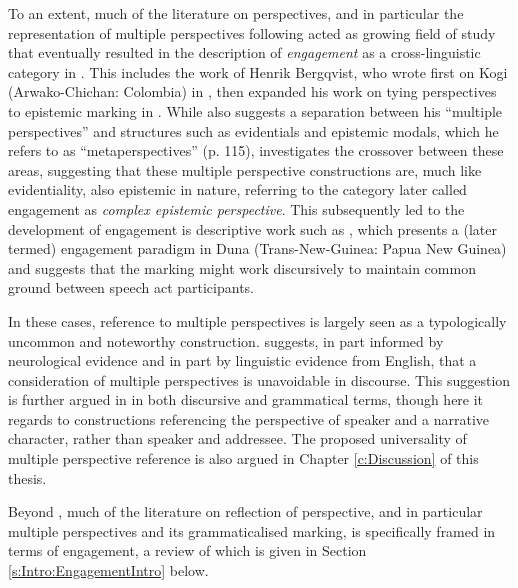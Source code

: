 To an extent, much of the literature on perspectives, and in particular the representation of multiple perspectives following  acted as growing field of study that eventually resulted in the description of \textit{engagement} as a cross-linguistic category in . This includes the work of Henrik Bergqvist, who wrote first on Kogi (Arwako-Chichan: Colombia) in , then expanded his work on tying perspectives to epistemic marking in . While  also suggests a separation between his ``multiple perspectives'' and structures such as evidentials and epistemic modals, which he refers to as ``metaperspectives'' (p. 115),  investigates the crossover between these areas, suggesting that these multiple perspective constructions are, much like evidentiality, also epistemic in nature, referring to the category later called engagement as \textit{complex epistemic perspective}. This subsequently led to the development of engagement is descriptive work such as , which presents a (later termed) engagement paradigm in Duna (Trans-New-Guinea: Papua New Guinea) and suggests that the marking might work discursively to maintain common ground between speech act participants.

In these cases, reference to multiple perspectives is largely seen as a typologically uncommon and noteworthy construction.  suggests, in part informed by neurological evidence and in part by linguistic evidence from English, that a consideration of multiple perspectives is unavoidable in discourse. This suggestion is further argued in  in both discursive and grammatical terms, though here it regards to constructions referencing the perspective of speaker and a narrative character, rather than speaker and addressee. The proposed universality of multiple perspective reference is also argued in Chapter \ref{c:Discussion} of this thesis. 

Beyond , much of the literature on reflection of perspective, and in particular multiple perspectives and its grammaticalised marking, is specifically framed in terms of engagement, a review of which is given in Section \ref{s:Intro:EngagementIntro} below.

